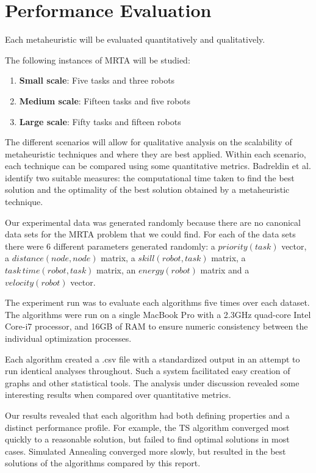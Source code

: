 \documentclass[a4paper]{article}
\begin{document}
\newpage
\section{Performance Evaluation}

Each metaheuristic will be evaluated quantitatively and qualitatively.

The following instances of MRTA will be studied:
\begin{enumerate}
\item \textbf{Small scale}: Five tasks and three robots
\item \textbf{Medium scale}: Fifteen tasks and five robots
\item \textbf{Large scale}: Fifty tasks and fifteen robots
\end{enumerate}

The different scenarios will allow for qualitative analysis on the scalability of metaheuristic techniques and where they are best applied. Within each scenario, each technique can be compared using some quantitative metrics. Badreldin et al. \cite{Badreldin} identify two suitable measures: the computational time taken to find the best solution and the optimality of the best solution obtained by a metaheuristic technique.

Our experimental data was generated randomly because there are no canonical data sets for the MRTA problem that we could find. For each of the data sets there were 6 different parameters generated randomly: a $\mathit{priority(task)}$ vector, a $\mathit{distance(node, node)}$ matrix, a $\mathit{skill(robot, task)}$ matrix, a $\mathit{task\,time(robot, task)}$ matrix, an $\mathit{energy(robot)}$ matrix and a $\mathit{velocity(robot)}$ vector.

The experiment run was to evaluate each algorithms five times over each dataset. The algorithms were run on a single MacBook Pro with a 2.3GHz quad-core Intel Core-i7 processor, and 16GB of RAM to ensure numeric consistency between the individual optimization processes.

Each algorithm created a .csv file with a standardized output in an attempt to run identical analyses throughout. Such a system facilitated easy creation of graphs and other statistical tools. The analysis under discussion revealed some interesting results when compared over quantitative metrics.

Our results revealed that each algorithm had both defining properties and a distinct performance profile. For example, the TS algorithm converged most quickly to a reasonable solution, but failed to find optimal solutions in most cases. Simulated Annealing converged more slowly, but resulted in the best solutions of the algorithms compared by this report.
\end{document}
